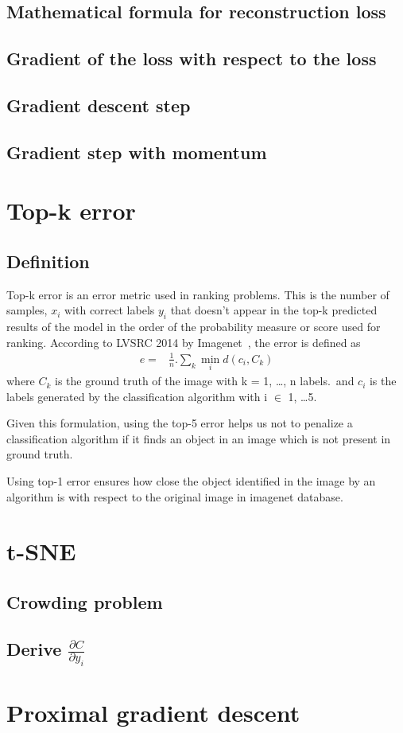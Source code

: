 \documentclass{article}
\begin{document}
\subsection{Mathematical formula for reconstruction loss}
\subsection{Gradient of the loss with respect to the loss}
\subsection{Gradient descent step}
\subsection{Gradient step with momentum}

\section{Top-k error}
\subsection{Definition}
Top-k error is an error metric used in ranking problems.  
This is the number of samples, $x_{i}$ with correct labels $ y_{i} $ that doesn't appear in the top-k predicted results of the model in the order of the probability measure or score used for ranking.  
According to LVSRC 2014 by Imagenet~\cite{ILSVRC15}, the error is defined as
\begin{align*}
  e =& \frac{1}{n}. \sum_{k} \min_{i} d(c_{i}, C_{k})
\end{align*}
where $C_{k}$ is the ground truth of the image with k = 1, \ldots, n labels.\ 
and $c_{i}$ is the labels generated by the classification algorithm with i $\in$ 1, \ldots 5.

Given this formulation, using the top-5 error helps us not to penalize a classification algorithm if it finds an object in an image which is not present in ground truth.

Using top-1 error ensures how close the object identified in the image by an algorithm is with respect to the original image in imagenet database.

\section{t-SNE}
\subsection{Crowding problem}
\subsection{Derive $\frac{\partial C}{\partial y_{i}}$}

\section{Proximal gradient descent}



\end{document}
